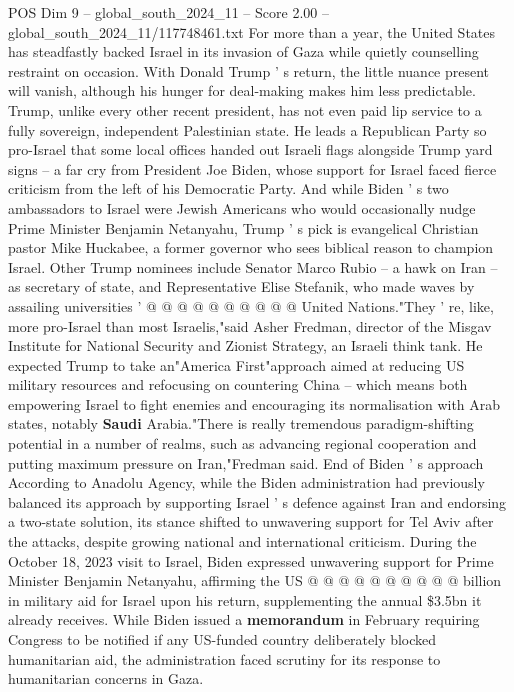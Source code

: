 \begin{textsample}{POS Dim 9 – global\_south\_2024\_11 – Score 2.00 – global\_south\_2024\_11/117748461.txt}  \label{ex:f9_pos_028}
For more than a year, the United States has steadfastly backed Israel in its invasion of Gaza while quietly counselling restraint on occasion.
With Donald Trump ' s return, the little nuance present will vanish, although his hunger for deal-making makes him less predictable.
Trump, unlike every other recent president, has not even paid lip service to a fully sovereign, independent Palestinian state.
He leads a Republican Party so pro-Israel that some local offices handed out Israeli flags alongside Trump yard signs -- a far cry from President Joe Biden, whose support for Israel faced fierce criticism from the left of his Democratic Party.
And while Biden ' s two ambassadors to Israel were Jewish Americans who would occasionally nudge Prime Minister Benjamin Netanyahu, Trump ' s pick is evangelical Christian pastor Mike Huckabee, a former governor who sees biblical reason to champion Israel.
Other Trump nominees include Senator Marco Rubio -- a hawk on Iran -- as secretary of state, and Representative Elise Stefanik, who made waves by assailing universities ' @ @ @ @ @ @ @ @ @ @ United Nations."They ' re, like, more pro-Israel than most Israelis,"said Asher Fredman, director of the Misgav Institute for National Security and Zionist Strategy, an Israeli think tank.
He expected Trump to take an"America First"approach aimed at reducing US military resources and refocusing on countering China -- which means both empowering Israel to fight enemies and encouraging its normalisation with Arab states, notably \textbf{Saudi} Arabia."There is really tremendous paradigm-shifting potential in a number of realms, such as advancing regional cooperation and putting maximum pressure on Iran,"Fredman said.
End of Biden ' s approach According to Anadolu Agency, while the Biden administration had previously balanced its approach by supporting Israel ' s defence against Iran and endorsing a two-state solution, its stance shifted to unwavering support for Tel Aviv after the attacks, despite growing national and international criticism.
During the October 18, 2023 visit to Israel, Biden expressed unwavering support for Prime Minister Benjamin Netanyahu, affirming the US @ @ @ @ @ @ @ @ @ @ billion in military aid for Israel upon his return, supplementing the annual \$3.5bn it already receives.
While Biden issued a \textbf{memorandum} in February requiring Congress to be notified if any US-funded country deliberately blocked humanitarian aid, the administration faced scrutiny for its response to humanitarian concerns in Gaza.

\end{textsample}
